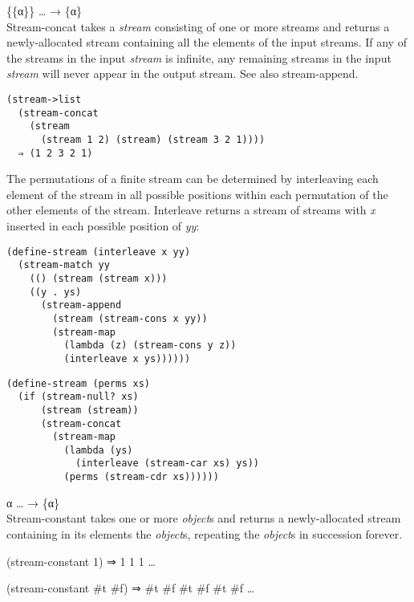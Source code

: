 \begin{entry}{%
  }

  \{\{α\}\} \ldots{} → \{α\}\\
  Stream-concat takes a \emph{stream} consisting of one or more
  streams and returns a newly-allocated stream containing all the
  elements of the input streams. If any of the streams in the input
  \emph{stream} is infinite, any remaining streams in the input
  \emph{stream} will never appear in the output stream. See also
  stream-append.

\begin{verbatim}
(stream->list
  (stream-concat
    (stream
      (stream 1 2) (stream) (stream 3 2 1))))
  ⇒ (1 2 3 2 1)
\end{verbatim}

  The permutations of a finite stream can be determined by
  interleaving each element of the stream in all possible positions
  within each permutation of the other elements of the
  stream. Interleave returns a stream of streams with \emph{x}
  inserted in each possible position of \emph{yy}:

\begin{verbatim}
(define-stream (interleave x yy)
  (stream-match yy
    (() (stream (stream x)))
    ((y . ys)
      (stream-append
        (stream (stream-cons x yy))
        (stream-map
          (lambda (z) (stream-cons y z))
          (interleave x ys))))))
\end{verbatim}

\begin{verbatim}
(define-stream (perms xs)
  (if (stream-null? xs)
      (stream (stream))
      (stream-concat
        (stream-map
          (lambda (ys)
            (interleave (stream-car xs) ys))
          (perms (stream-cdr xs))))))
\end{verbatim}
\end{entry}

\begin{entry}{%
  }

  α \ldots{} → \{α\}\\
  Stream-constant takes one or more \emph{object}s and returns a
  newly-allocated stream containing in its elements the
  \emph{object}s, repeating the \emph{object}s in succession forever.

  (stream-constant 1) ⇒ 1 1 1 \ldots{}

  (stream-constant \#t \#f) ⇒ \#t \#f \#t \#f \#t \#f \ldots{}
\end{entry}


